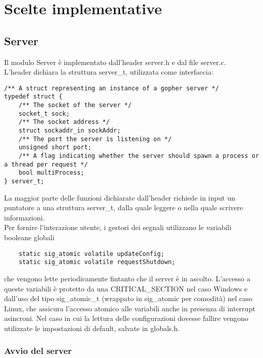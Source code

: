 \documentclass{article}
\begin{document}
\newpage


\section{Scelte implementative}

\subsection{Server}
Il modulo Server è implementato dall'header server.h e dal file server.c.\\
L'header dichiara la struttura server\_t, utilizzata come interfaccia:
\begin{lstlisting}
/** A struct representing an instance of a gopher server */
typedef struct {
    /** The socket of the server */
    socket_t sock;
    /** The socket address */
    struct sockaddr_in sockAddr;
    /** The port the server is listening on */
    unsigned short port;
    /** A flag indicating whether the server should spawn a process or a thread per request */
    bool multiProcess;
} server_t;
\end{lstlisting}
La maggior parte delle funzioni dichiarate dall'header richiede in input
un puntatore a una struttura server\_t, dalla quale leggere o nella quale scrivere informazioni.\\


Per fornire l'interazione utente, i gestori dei segnali utilizzano le variabili booleane globali
\begin{lstlisting}
    static sig_atomic volatile updateConfig;
    static sig_atomic volatile requestShutdown;
\end{lstlisting}
che vengono lette periodicamente fintanto che il server è in ascolto. L'accesso a queste variabili è 
protetto da una CRITICAL\_SECTION nel caso Windows e dall'uso del tipo sig\_atomic\_t (wrappato in sig\_atomic per comodità)
nel caso Linux, che assicura l'accesso atomico alle variabili anche in presenza di interrupt asincroni.
Nel caso in cui la lettura delle configurazioni dovesse fallire vengono utilizzate le 
impostazioni di default, salvate in globals.h.

\subsubsection{Avvio del server}
\end{document}

